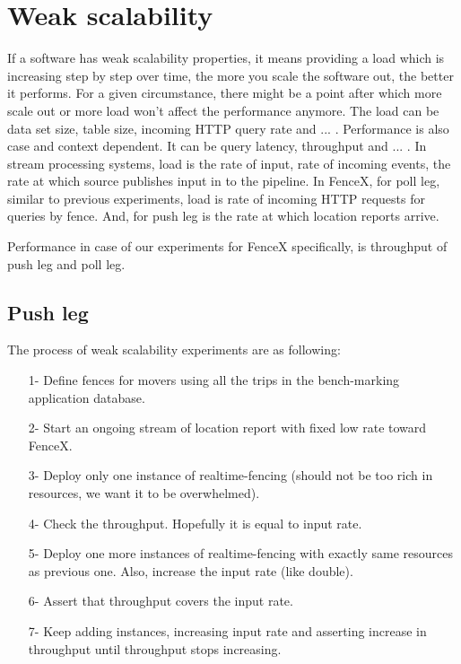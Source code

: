 \documentclass[a4]{report}
\begin{document}
        \section{Weak scalability}
        If a software has weak scalability properties, it means providing a load which is increasing step by step over
        time, the more you scale the software out, the better it performs.
        For a given circumstance, there might be a point after which more scale out or more load won't affect
        the performance anymore.
        The load can be data set size, table size, incoming HTTP query rate and ... .
        Performance is also case and context dependent.
        It can be query latency, throughput and ... .
        In stream processing systems, load is the rate of input, rate of incoming events, the rate at
        which source publishes input in to the pipeline.
        In FenceX, for poll leg, similar to previous experiments, load is rate of incoming HTTP requests for queries by
        fence.
        And, for push leg is the rate at which location reports arrive.

        Performance in case of our experiments for FenceX specifically, is throughput of push leg and poll leg.

        \subsection{Push leg}
        The process of weak scalability experiments are as following:
        \begin{itemize}
            \item[1-] Define fences for movers using all the trips in the bench-marking application database.
            \item[2-] Start an ongoing stream of location report with fixed low rate toward FenceX.
            \item[3-] Deploy only one instance of realtime-fencing (should not be too rich in resources, we want it to
            be overwhelmed).
            \item[4-] Check the throughput. Hopefully it is equal to input rate.
            \item[5-] Deploy one more instances of realtime-fencing with exactly same resources as previous one. Also,
            increase the input rate (like double).
            \item[6-] Assert that throughput covers the input rate.
            \item[7-] Keep adding instances, increasing input rate and asserting increase in throughput until throughput
            stops increasing.
        \end{itemize}
\end{document}
